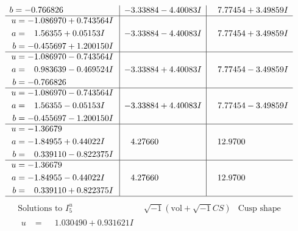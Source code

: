 \documentclass[1p]{elsarticle_modified}
\theoremstyle{definition}
\newcommand{\I}{\sqrt{-1}}
\begin{document}
$$\begin{array}{c|c|c}
\begin{aligned}
b &= -0.766826\phantom{ +0.000000I}\end{aligned}
 & -3.33884 - 4.40083 I & \phantom{-}7.77454 + 3.49859 I \\ \hline\begin{aligned}
u &= -1.086970 + 0.743564 I \\
a &= \phantom{-}1.56355 + 0.05153 I \\
b &= -0.455697 + 1.200150 I\end{aligned}
 & -3.33884 - 4.40083 I & \phantom{-}7.77454 + 3.49859 I \\ \hline\begin{aligned}
u &= -1.086970 - 0.743564 I \\
a &= \phantom{-}0.983639 - 0.469524 I \\
b &= -0.766826\phantom{ +0.000000I}\end{aligned}
 & -3.33884 + 4.40083 I & \phantom{-}7.77454 - 3.49859 I \\ \hline\begin{aligned}
u &= -1.086970 - 0.743564 I \\
a &= \phantom{-}1.56355 - 0.05153 I \\
b &= -0.455697 - 1.200150 I\end{aligned}
 & -3.33884 + 4.40083 I & \phantom{-}7.77454 - 3.49859 I \\ \hline\begin{aligned}
u &= -1.36679\phantom{ +0.000000I} \\
a &= -1.84955 + 0.44022 I \\
b &= \phantom{-}0.339110 - 0.822375 I\end{aligned}
 & \phantom{-}4.27660\phantom{ +0.000000I} & \phantom{-}12.9700\phantom{ +0.000000I} \\ \hline\begin{aligned}
u &= -1.36679\phantom{ +0.000000I} \\
a &= -1.84955 - 0.44022 I \\
b &= \phantom{-}0.339110 + 0.822375 I\end{aligned}
 & \phantom{-}4.27660\phantom{ +0.000000I} & \phantom{-}12.9700\phantom{ +0.000000I}\\
 \hline 
 \end{array}$$\newpage$$\begin{array}{c|c|c}  
\text{Solutions to }I^u_{5}& \I (\text{vol} + \sqrt{-1}CS) & \text{Cusp shape}\\
 \hline 
\begin{aligned}
u &= \phantom{-}1.030490 + 0.931621 I \\

\end{aligned}
\end{array}$$
\end{document}
